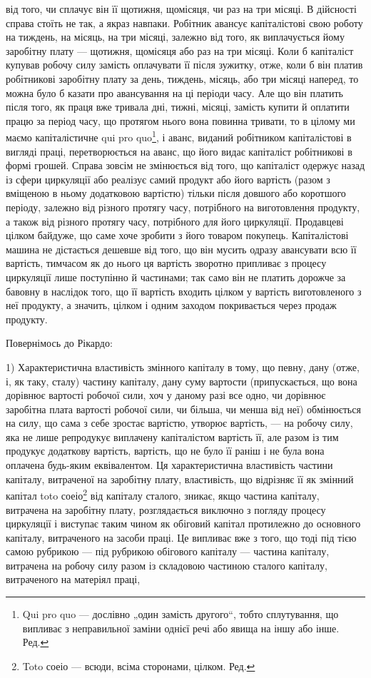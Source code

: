 \parcont{}  %
від того, чи сплачує він її щотижня, щомісяця, чи раз на три місяці.
В дійсності справа стоїть не так, а якраз навпаки. Робітник авансує
капіталістові свою роботу на тиждень, на місяць, на три місяці, залежно
від того, як виплачується йому заробітну плату — щотижня, щомісяця або
раз на три місяці. Коли б капіталіст купував робочу силу замість
оплачувати її після зужитку, отже, коли б він платив робітникові заробітну
плату за день, тиждень, місяць, або три місяці наперед, то можна
було б казати про авансування на ці періоди часу. Але що він платить
після того, як праця вже тривала дні, тижні, місяці, замість купити й
оплатити працю за період часу, що протягом нього вона повинна тривати,
то в цілому ми маємо капіталістичне qui pro quo\footnote*{
Qui pro quo — дослівно „один замість другого“, тобто сплутування, що
випливає з неправильної заміни однієї речі або явища на іншу або інше. Ред.
}, і аванс, виданий
робітником капіталістові в вигляді праці, перетворюється на аванс, що
його видає капіталіст робітникові в формі грошей. Справа зовсім не змінюється
від того, що капіталіст одержує назад із сфери циркуляції або
реалізує самий продукт або його вартість (разом з вміщеною в ньому
додатковою вартістю) тільки після довшого або коротшого періоду, залежно
від різного протягу часу, потрібного на виготовлення продукту,
а також від різного протягу часу, потрібного для його циркуляції. Продавцеві
цілком байдуже, що саме хоче зробити з його товаром покупець.
Капіталістові машина не дістається дешевше від того, що він мусить
одразу авансувати всю її вартість, тимчасом як до нього ця вартість
зворотно припливає з процесу циркуляції лише поступінно й частинами;
так само він не платить дорожче за бавовну в наслідок того, що її
вартість входить цілком у вартість виготовленого з неї продукту, а
значить, цілком і одним заходом покривається через продаж продукту.

Повернімось до Рікардо:

1) Характеристична властивість змінного капіталу в тому, що певну,
дану (отже, і, як таку, сталу) частину капіталу, дану суму вартости
(припускається, що вона дорівнює вартості робочої сили, хоч у даному
разі все одно, чи дорівнює заробітна плата вартості робочої сили, чи
більша, чи менша від неї) обмінюється на силу, що сама з себе
зростає вартістю, утворює вартість, — на робочу силу, яка не лише репродукує
виплачену капіталістом вартість її, але разом із тим продукує
додаткову вартість, вартість, що не було її раніш і не була вона
оплачена будь-яким еквівалентом. Ця характеристична властивість частини
капіталу, витраченої на заробітну плату, властивість, що відрізняє її як
змінний капітал toto соеіо\footnote*{
Toto соеіо — всюди, всіма сторонами, цілком. Ред.
} від капіталу сталого, зникає, якщо частина
капіталу, витрачена на заробітну плату, розглядається виключно з погляду
процесу циркуляції і виступає таким чином як обіговий капітал
протилежно до основного капіталу, витраченого на засоби праці. Це
випливає вже з того, що тоді під тією самою рубрикою — під рубрикою
обігового капіталу — частина капіталу, витрачена на робочу силу разом із
складовою частиною сталого капіталу, витраченого на матеріял праці,
\parbreak{}  %
